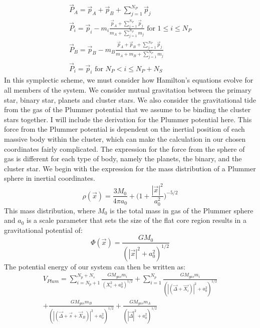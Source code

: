 \documentclass{aastex631}
\begin{document}
\begin{equation}
    \begin{split}
        \vec{P}_A = \vec{p}_A+\vec{p}_B + \sum_{j=1}^{N_P}\vec{p}_j \\
        \vec{P}_i = \vec{p}_i-m_i\frac{\vec{p}_A+\sum_{j=1}^{N_P}\vec{p}_j}{m_A+\sum_{j=1}^{N_P}m_j} \text{   for   } 1\leq i \leq N_P \\
        \vec{P}_B = \vec{p}_B -m_B\frac{\vec{p}_A+\vec{p}_B+\sum_{j=1}^{N_P}\vec{p}_j}{m_A+m_B+\sum_{j=1}^{N_P}m_j} \\
        \vec{P}_i = \vec{p}_i \text{   for   } N_P < i \leq N_P+N_S
    \end{split}
\end{equation}
\indent In this symplectic scheme, we must consider how Hamilton's equations evolve for all members of the system. We consider mutual gravitation
between the primary star, binary star, planets and cluster stars. We also consider the gravitational tide from the gas of the 
Plummer potential \citep{plu11} that we assume to be binding the cluster stars together. I will include the derivation for the Plummer potential here.
This force from the Plummer potential is dependent on the inertial position of each massive body within the cluster, which can make the 
calculation in our chosen coordinates fairly complicated. The expression for the force from the sphere of gas is different for each type of body,
namely the planets, the binary, and the cluster star. We begin with the expression for the mass distribution of a Plummer sphere in inertial coordinates. 
\begin{equation}
\rho (\vec{x}) = \frac{3M_0}{4\pi a_0}+\biggl(1+\frac{|\vec{x}|^2}{a_0^2} \biggr)^{-5/2}
\end{equation}
This mass distribution, where $M_0$ is the total mass in gas of the Plummer sphere and $a_0$ is a scale parameter that sets the size of the flat core region results
in a gravitational potential of:
\begin{equation}
    \Phi(\vec{x}) = \frac{GM_0}{(|\vec{x}|^2+a_0^2)^{1/2}}
\end{equation} 
The potential energy of our system can then be written as:
\begin{equation}
    \begin{split}
        V_{Plum} = \sum_{i=N_p+1}^{N_p+N_s}\frac{GM_{gas}m_i}{(X_i^2+a_0^2)^{1/2}} + 
        \sum_{i=1}^{N_p}\frac{GM_{gas}m_i}{(|(\vec{\Delta}+ \vec{X_i})|^2+a_0^2)^{1/2}} \\ 
        +\frac{GM_{gas}m_B}{(|(\vec{\Delta} + \vec{s} + \vec{X}_B)|^2+a_0^2)^{1/2}} 
        + \frac{GM_{gas}m_A}{(|\vec{\Delta}|^2+a_0^2)^{1/2}} 
    \end{split}
\end{equation}
\end{document}
